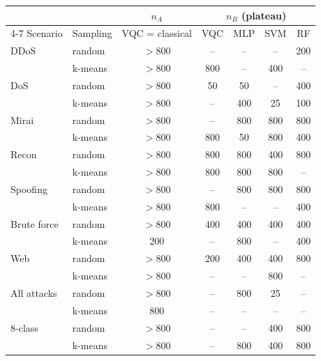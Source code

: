 \begin{tabular}{llccccc}
\toprule
 & & $n_A$ & \multicolumn{4}{c}{$n_B$ (plateau)} \\ \cmidrule(lr){4-7}
Scenario & Sampling & VQC = classical & VQC & MLP & SVM & RF \\
\midrule
DDoS & random & $>$800 & -- & -- & -- & 200 \\
 & k-means & $>$800 & 800 & -- & 400 & -- \\
DoS & random & $>$800 & 50 & 50 & -- & 400 \\
 & k-means & $>$800 & -- & 400 & 25 & 100 \\
Mirai & random & $>$800 & -- & 800 & 800 & 800 \\
 & k-means & $>$800 & 800 & 50 & 800 & 400 \\
Recon & random & $>$800 & 800 & 800 & 400 & 800 \\
 & k-means & $>$800 & 800 & 800 & 800 & -- \\
Spoofing & random & $>$800 & -- & 800 & 800 & 800 \\
 & k-means & $>$800 & 800 & -- & -- & 400 \\
Brute force & random & $>$800 & 400 & 400 & 400 & 400 \\
 & k-means & 200 & -- & 800 & -- & 400 \\
Web & random & $>$800 & 200 & 400 & 400 & 800 \\
 & k-means & $>$800 & -- & -- & 800 & -- \\
All attacks & random & $>$800 & -- & 800 & 25 & -- \\
 & k-means & 800 & -- & -- & -- & -- \\
8-class & random & $>$800 & -- & -- & 400 & 800 \\
 & k-means & $>$800 & -- & 800 & 400 & 800 \\
\bottomrule
\end{tabular}
